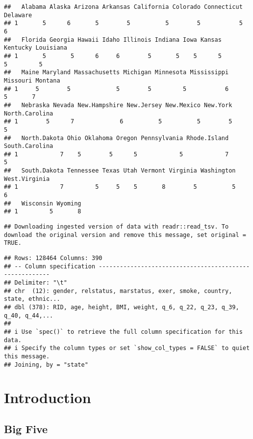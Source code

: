 \documentclass[
]{article}
\begin{document}
\begin{verbatim}
##   Alabama Alaska Arizona Arkansas California Colorado Connecticut Delaware
## 1       5      6       5        5          5        5           5        6
##   Florida Georgia Hawaii Idaho Illinois Indiana Iowa Kansas Kentucky Louisiana
## 1       5       5      6     6        5       5    5      5        5         5
##   Maine Maryland Massachusetts Michigan Minnesota Mississippi Missouri Montana
## 1     5        5             5        5         5           6        5       7
##   Nebraska Nevada New.Hampshire New.Jersey New.Mexico New.York North.Carolina
## 1        5      7             6          5          5        5              5
##   North.Dakota Ohio Oklahoma Oregon Pennsylvania Rhode.Island South.Carolina
## 1            7    5        5      5            5            7              5
##   South.Dakota Tennessee Texas Utah Vermont Virginia Washington West.Virginia
## 1            7         5     5    5       8        5          5             6
##   Wisconsin Wyoming
## 1         5       8
\end{verbatim}

\begin{verbatim}
## Downloading ingested version of data with readr::read_tsv. To download the original version and remove this message, set original = TRUE.
\end{verbatim}

\begin{verbatim}
## Rows: 128464 Columns: 390
## -- Column specification --------------------------------------------------------
## Delimiter: "\t"
## chr  (12): gender, relstatus, marstatus, exer, smoke, country, state, ethnic...
## dbl (378): RID, age, height, BMI, weight, q_6, q_22, q_23, q_39, q_40, q_44,...
## 
## i Use `spec()` to retrieve the full column specification for this data.
## i Specify the column types or set `show_col_types = FALSE` to quiet this message.
## Joining, by = "state"
\end{verbatim}

\newpage

\hypertarget{introduction}{%
\section{Introduction}\label{introduction}}

\hypertarget{big-five}{%
\subsection{Big Five}\label{big-five}}
\end{document}
